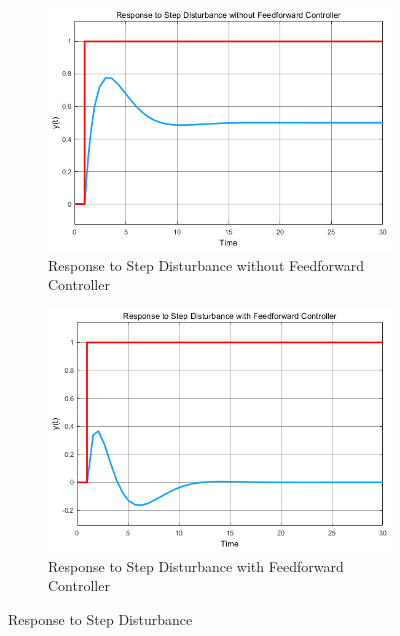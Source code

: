 \documentclass[a4paper,12pt]{article}
\begin{document}
\begin{enumerate}
\begin{figure}[H]
	\setlength{\unitlength}{\textwidth} 
	\centering
	\begin{subfigure}{.5\textwidth}
  		\centering
  		\includegraphics[width=0.48\unitlength]{images/without_ff}
  		\caption{\label{fig:withoutff}Response to Step Disturbance without Feedforward Controller }
	\end{subfigure}%
	\begin{subfigure}{.5\textwidth}
  		\centering
		\includegraphics[width=0.48\unitlength]{images/with_ff}
  		\caption{\label{fig:withff}Response to Step Disturbance with Feedforward Controller}
	\end{subfigure}
\caption{\label{fig:ff} Response to Step Disturbance  }   
\end{figure}


\end{enumerate}
\end{document}
